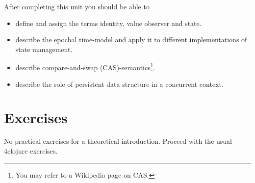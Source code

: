 \documentclass[11pt,a4paper]{article}
\begin{document}
After completing this unit you should be able to

\begin{itemize}
	\item define and assign the terms identity, value observer and state.
    \item describe the epochal time-model and apply it to different implementations of state management.
    \item describe compare-and-swap (CAS)-semantics\footnote{You may refer to a Wikipedia page on CAS.}.
    \item describe the role of persistent data structure in a concurrent context.
\end{itemize}


\section{Exercises}

No practical exercises for a theoretical introduction.
Proceed with the usual 4clojure exercises.
\end{document}
